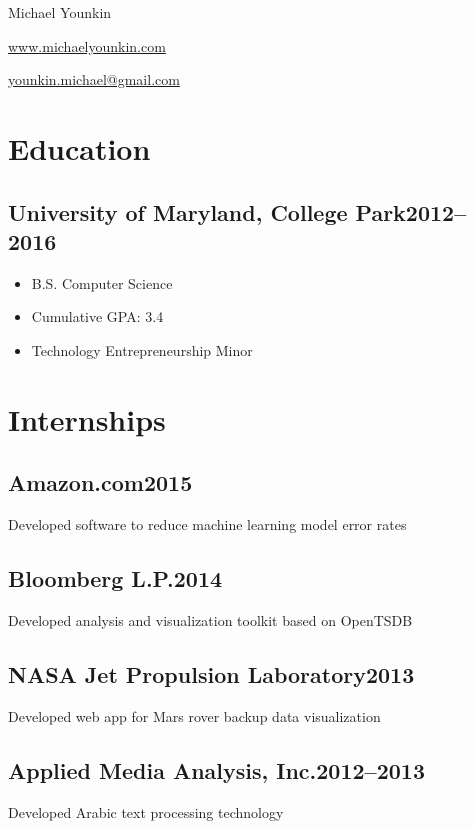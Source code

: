 \documentclass{article}
\newcommand{\subsectiondate}[2]{\subsection*{#1\hfill#2}}
\begin{document}
\begin{center}
    {\LARGE Michael Younkin}

    \href{http://www.michaelyounkin.com}{www.michaelyounkin.com}

    \href{mailto:younkin.michael@gmail.com}{younkin.michael@gmail.com}
\end{center}


\section*{Education}

\subsectiondate{University of Maryland, College Park}{2012--2016}

\begin{itemize}
    \item B.S. Computer Science
    \item Cumulative GPA\@: 3.4
    \item Technology Entrepreneurship Minor
\end{itemize}


\section*{Internships}

\subsectiondate{Amazon.com}{2015}

Developed software to reduce machine learning model error rates

\subsectiondate{Bloomberg L.P.}{2014}

Developed analysis and visualization toolkit based on OpenTSDB

\subsectiondate{NASA Jet Propulsion Laboratory}{2013}

Developed web app for Mars rover backup data visualization

\subsectiondate{Applied Media Analysis, Inc.}{2012--2013}

Developed Arabic text processing technology


\end{document}
